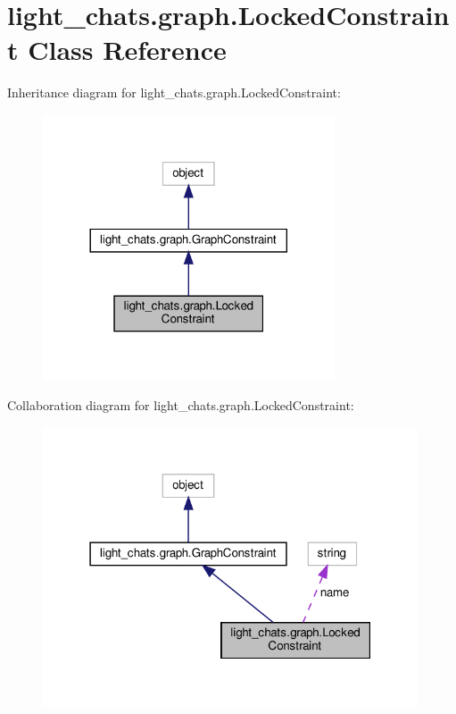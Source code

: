 \hypertarget{classlight__chats_1_1graph_1_1LockedConstraint}{}\section{light\+\_\+chats.\+graph.\+Locked\+Constraint Class Reference}
\label{classlight__chats_1_1graph_1_1LockedConstraint}


Inheritance diagram for light\+\_\+chats.\+graph.\+Locked\+Constraint\+:
\nopagebreak
\begin{figure}[H]
\begin{center}
\leavevmode
\includegraphics[width=245pt]{classlight__chats_1_1graph_1_1LockedConstraint__inherit__graph}
\end{center}
\end{figure}


Collaboration diagram for light\+\_\+chats.\+graph.\+Locked\+Constraint\+:
\nopagebreak
\begin{figure}[H]
\begin{center}
\leavevmode
\includegraphics[width=315pt]{classlight__chats_1_1graph_1_1LockedConstraint__coll__graph}
\end{center}
\end{figure}
